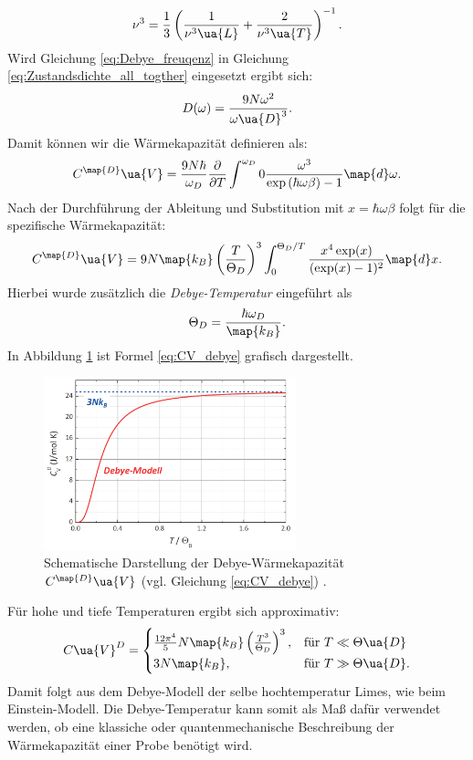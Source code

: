 \begin{equation*}
  \nu^3= \frac{1}{3}\left(\frac{1}{\nu^3\ua{L}} + \frac{2}{\nu^3\ua{T}}\right)^{-1}.
\end{equation*}
Wird Gleichung \eqref{eq:Debye_freuqenz} in Gleichung \eqref{eq:Zustandsdichte_all_togther}
eingesetzt ergibt sich:
\begin{equation}
  \label{eq:Zustandsdichte_Debye}
  D(\omega)= \frac{9N\omega^2}{\omega\ua{D}^3}.
\end{equation}
Damit können wir die Wärmekapazität definieren als:
\begin{equation}
  \label{eq:CVD_ohne_x}
  C^{\map{D}}\ua{V}=\frac{9N\hbar}{\omega_D}\frac{\partial}{\partial T}\int^{\omega_D}{0}\frac{\omega^3}{\exp\left(\hbar\omega\beta\right)-1} \map{d}\omega.
\end{equation}
Nach der Durchführung der Ableitung und Substitution mit $x=\hbar\omega\beta$
folgt für die spezifische Wärmekapazität:
\begin{equation}
  \label{eq:CV_debye}
  C^{\map{D}}\ua{V}=9N\map{k_B}\left(\frac{T}{\Theta_D}\right)^3\int^{\Theta_D/T}_{0} \frac{x^4\exp(x)}{(\exp(x)-1)^2}\map{d}x.
\end{equation}
Hierbei wurde zusätzlich die \emph{Debye-Temperatur} eingeführt als
\begin{equation}
  \label{eq:Debye_Temp}
  \Theta_D = \frac{\hbar\omega_D}{\map{k_B}}.
\end{equation}
In Abbildung \ref{fig: CVD_plot} ist Formel \eqref{eq:CV_debye} grafisch dargestellt.
\begin{figure}
  \centering
  \includegraphics[width = 0.65\textwidth]{./content/images/C_V_debye.PNG}
  \caption{Schematische Darstellung der Debye-Wärmekapazität $C^{\map{D}}\ua{V}$ (vgl. Gleichung \eqref{eq:CV_debye})  \cite[S. 228]{marx}.}
  \label{fig: CVD_plot}
\end{figure}
Für hohe und tiefe Temperaturen ergibt sich approximativ:
\begin{equation}
  C\ua{V}^{D}=
  \begin{cases}
    \frac{12\pi^4}{5}N\map{k_B}\left(\frac{T^3}{\Theta_D}\right)^3, &\text{für } T\ll\Theta\ua{D}  \\
     3N\map{k_B}, & \text{für } T \gg \Theta\ua{D}.
  \end{cases}
\end{equation}
Damit folgt aus dem Debye-Modell der selbe hochtemperatur Limes, wie beim Einstein-Modell.
Die Debye-Temperatur kann somit als Maß dafür verwendet werden, ob eine klassiche
oder quantenmechanische Beschreibung der Wärmekapazität einer Probe benötigt wird.
